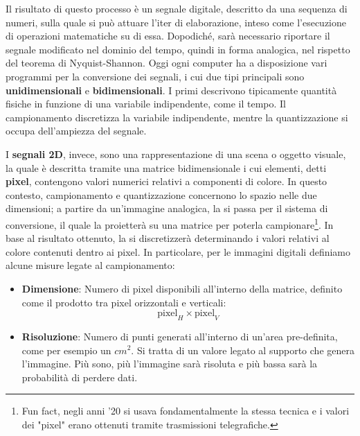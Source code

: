 \noindent Il risultato di questo processo è un segnale digitale, descritto da una sequenza di numeri, sulla quale si può attuare l'iter di elaborazione,
inteso come l'esecuzione di operazioni matematiche su di essa. Dopodiché, sarà necessario riportare il segnale modificato nel dominio del tempo, quindi
in forma analogica, nel rispetto del teorema di Nyquist-Shannon. Oggi ogni computer ha a disposizione vari programmi per la conversione dei segnali, i
cui due tipi principali sono \textbf{unidimensionali} e \textbf{bidimensionali}. I primi descrivono tipicamente quantità fisiche in funzione di una
variabile indipendente, come il tempo. Il campionamento discretizza la variabile indipendente, mentre la quantizzazione si occupa dell'ampiezza del
segnale.\par
I \textbf{segnali 2D}, invece, sono una rappresentazione di una scena o oggetto visuale, la quale è descritta tramite una matrice bidimensionale i cui
elementi, detti \textbf{pixel}, contengono valori numerici relativi a componenti di colore. In questo contesto, campionamento e quantizzazione
concernono lo spazio nelle due dimensioni; a partire da un'immagine analogica, la si passa per il sistema di conversione, il quale la proietterà su una
matrice per poterla campionare\footnote{Fun fact, negli anni '20 si usava fondamentalmente la stessa tecnica e i valori dei "pixel" erano ottenuti
tramite trasmissioni telegrafiche.}. In base al risultato ottenuto, la si discretizzerà determinando i valori relativi al colore contenuti dentro ai
pixel. In particolare, per le immagini digitali definiamo alcune misure legate al campionamento: \begin{itemize}
	\item \textbf{Dimensione}: Numero di pixel disponibili all'interno della matrice, definito come il prodotto tra pixel orizzontali e verticali: \[
		\text{pixel}_H\times \text{pixel}_V
	\]
	\item \textbf{Risoluzione}: Numero di punti generati all'interno di un'area	pre-definita, come per esempio un $cm^2$. Si tratta di un valore legato
	al supporto che genera l'immagine. Più sono, più l'immagine sarà risoluta e più bassa sarà la probabilità di perdere dati.
\end{itemize}

